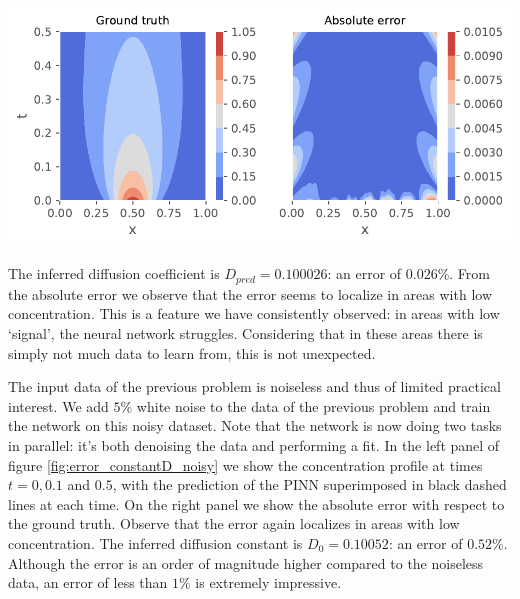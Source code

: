 \documentclass{Dissertate}
\let\origfigure\figure
\let\endorigfigure\endfigure
\renewenvironment{figure}[1][2] {
    \expandafter\origfigure\expandafter[H]
} {
    \endorigfigure
}
\begin{document}
\begin{figure}
\hypertarget{fig:constantD}{%
\centering
\includegraphics{source/figures/pdf/error_constantD.pdf}
\caption{\textbf{Left panel}: Simulated ground truth of the problem.
\textbf{Right panel}: The absolute error of neural network. Note that
most of the error is located at areas with low concentration,
i.e.~signal.}\label{fig:constantD}
}
\end{figure}

The inferred diffusion coefficient is \(D_{pred} = 0.100026\): an error
of \(0.026\%\). From the absolute error we observe that the error seems
to localize in areas with low concentration. This is a feature we have
consistently observed: in areas with low `signal', the neural network
struggles. Considering that in these areas there is simply not much data
to learn from, this is not unexpected.

The input data of the previous problem is noiseless and thus of limited
practical interest. We add \(5\%\) white noise to the data of the
previous problem and train the network on this noisy dataset. Note that
the network is now doing two tasks in parallel: it's both denoising the
data and performing a fit. In the left panel of figure
\ref{fig:error_constantD_noisy} we show the concentration profile
at times \(t = 0, 0.1\) and \(0.5\), with the prediction of the PINN
superimposed in black dashed lines at each time. On the right panel we
show the absolute error with respect to the ground truth. Observe that
the error again localizes in areas with low concentration. The inferred
diffusion constant is \(D_0 = 0.10052\): an error of \(0.52\%\).
Although the error is an order of magnitude higher compared to the
noiseless data, an error of less than \(1\%\) is extremely impressive.
\end{document}
